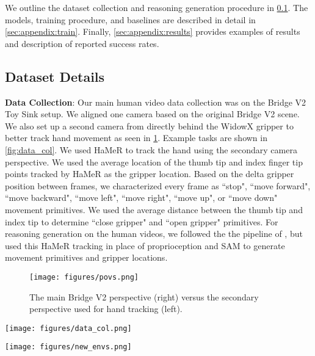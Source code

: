 

We outline the dataset collection and reasoning generation procedure in \cref{sec:appendix:data}. The models, training procedure, and baselines are described in detail in \cref{sec:appendix:train}. Finally, \cref{sec:appendix:results} provides examples of results and description of reported success rates.

\subsection{Dataset Details}\label{sec:appendix:data}

\smallskip \noindent \textbf{Data Collection}: Our main human video data collection was on the Bridge V2 Toy Sink setup. We aligned one camera based on the original Bridge V2 scene. We also set up a second camera from directly behind the WidowX gripper to better track hand movement as seen in \cref{fig:povs}. Example tasks are shown in \cref{fig:data_col}. We used HaMeR to track the hand using the secondary camera perspective. We used the average location of the thumb tip and index finger tip points tracked by HaMeR as the gripper location. Based on the delta gripper position between frames, we characterized every frame as ``stop", ``move forward", ``move backward", ``move left", ``move right", ``move up", or ``move down" movement primitives. We used the average distance between the thumb tip and index tip to determine ``close gripper" and ``open gripper" primitives. For reasoning generation on the human videos, we followed the the pipeline of \cite{zawalski2024robotic}, but used this HaMeR tracking in place of proprioception and SAM to generate movement primitives and gripper locations.

\begin{figure}[!ht]
    \centering
    \texttt{[image: figures/povs.png]}
    \caption{The main Bridge V2 perspective (right) versus the secondary perspective used for hand tracking (left).}
    \label{fig:povs}
\end{figure}

\begin{figure*}[!ht]
    \centering
    \texttt{[image: figures/data\_col.png]}
    \caption{Example human video tasks collected.}
    \label{fig:data_col}
\end{figure*}

\begin{figure*}[!ht]
    \centering
    \texttt{[image: figures/new\_envs.png]}
    \caption{Task demonstrations collected in environments outside of Bridge V2 to assess how \ACRO responds to data from different types of scenes.}
    \label{fig:new_envs}
\end{figure*}

